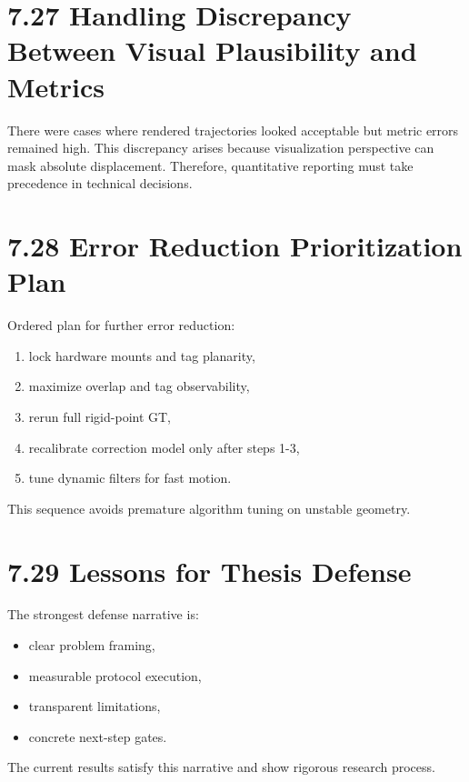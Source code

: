 \section{7.27 Handling Discrepancy Between Visual Plausibility and Metrics}
There were cases where rendered trajectories looked acceptable but metric errors remained high. This discrepancy arises because visualization perspective can mask absolute displacement. Therefore, quantitative reporting must take precedence in technical decisions.

\section{7.28 Error Reduction Prioritization Plan}
Ordered plan for further error reduction:
\begin{enumerate}
  \item lock hardware mounts and tag planarity,
  \item maximize overlap and tag observability,
  \item rerun full rigid-point GT,
  \item recalibrate correction model only after steps 1-3,
  \item tune dynamic filters for fast motion.
\end{enumerate}

This sequence avoids premature algorithm tuning on unstable geometry.

\section{7.29 Lessons for Thesis Defense}
The strongest defense narrative is:
\begin{itemize}
  \item clear problem framing,
  \item measurable protocol execution,
  \item transparent limitations,
  \item concrete next-step gates.
\end{itemize}

The current results satisfy this narrative and show rigorous research process.
